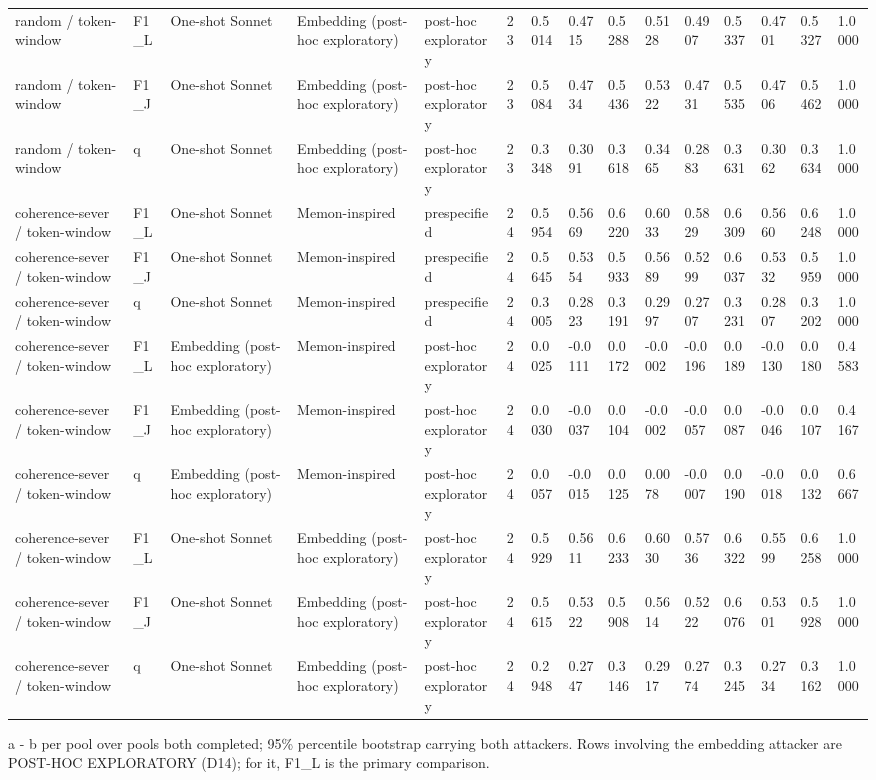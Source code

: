 \begin{table}[t]
{\begin{tabular}{lllllllllllllll}
random / token-window & F1\_L & One-shot Sonnet & Embedding (post-hoc exploratory) & post-hoc exploratory & 23 & 0.5014 & 0.4715 & 0.5288 & 0.5128 & 0.4907 & 0.5337 & 0.4701 & 0.5327 & 1.0000 \\
random / token-window & F1\_J & One-shot Sonnet & Embedding (post-hoc exploratory) & post-hoc exploratory & 23 & 0.5084 & 0.4734 & 0.5436 & 0.5322 & 0.4731 & 0.5535 & 0.4706 & 0.5462 & 1.0000 \\
random / token-window & q & One-shot Sonnet & Embedding (post-hoc exploratory) & post-hoc exploratory & 23 & 0.3348 & 0.3091 & 0.3618 & 0.3465 & 0.2883 & 0.3631 & 0.3062 & 0.3634 & 1.0000 \\
coherence-sever / token-window & F1\_L & One-shot Sonnet & Memon-inspired & prespecified & 24 & 0.5954 & 0.5669 & 0.6220 & 0.6033 & 0.5829 & 0.6309 & 0.5660 & 0.6248 & 1.0000 \\
coherence-sever / token-window & F1\_J & One-shot Sonnet & Memon-inspired & prespecified & 24 & 0.5645 & 0.5354 & 0.5933 & 0.5689 & 0.5299 & 0.6037 & 0.5332 & 0.5959 & 1.0000 \\
coherence-sever / token-window & q & One-shot Sonnet & Memon-inspired & prespecified & 24 & 0.3005 & 0.2823 & 0.3191 & 0.2997 & 0.2707 & 0.3231 & 0.2807 & 0.3202 & 1.0000 \\
coherence-sever / token-window & F1\_L & Embedding (post-hoc exploratory) & Memon-inspired & post-hoc exploratory & 24 & 0.0025 & -0.0111 & 0.0172 & -0.0002 & -0.0196 & 0.0189 & -0.0130 & 0.0180 & 0.4583 \\
coherence-sever / token-window & F1\_J & Embedding (post-hoc exploratory) & Memon-inspired & post-hoc exploratory & 24 & 0.0030 & -0.0037 & 0.0104 & -0.0002 & -0.0057 & 0.0087 & -0.0046 & 0.0107 & 0.4167 \\
coherence-sever / token-window & q & Embedding (post-hoc exploratory) & Memon-inspired & post-hoc exploratory & 24 & 0.0057 & -0.0015 & 0.0125 & 0.0078 & -0.0007 & 0.0190 & -0.0018 & 0.0132 & 0.6667 \\
coherence-sever / token-window & F1\_L & One-shot Sonnet & Embedding (post-hoc exploratory) & post-hoc exploratory & 24 & 0.5929 & 0.5611 & 0.6233 & 0.6030 & 0.5736 & 0.6322 & 0.5599 & 0.6258 & 1.0000 \\
coherence-sever / token-window & F1\_J & One-shot Sonnet & Embedding (post-hoc exploratory) & post-hoc exploratory & 24 & 0.5615 & 0.5322 & 0.5908 & 0.5614 & 0.5222 & 0.6076 & 0.5301 & 0.5928 & 1.0000 \\
coherence-sever / token-window & q & One-shot Sonnet & Embedding (post-hoc exploratory) & post-hoc exploratory & 24 & 0.2948 & 0.2747 & 0.3146 & 0.2917 & 0.2774 & 0.3245 & 0.2734 & 0.3162 & 1.0000 \\
\bottomrule
\end{tabular}}
\par\smallskip\parbox{\linewidth}{\tiny a - b per pool over pools both completed; 95\% percentile bootstrap carrying both attackers. Rows involving the embedding attacker are POST-HOC EXPLORATORY (D14); for it, F1\_L is the primary comparison.}
\end{table}
